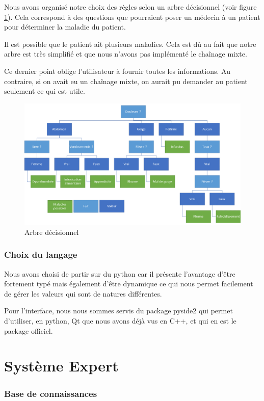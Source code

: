 \documentclass[a4paper, 11pt]{article}
\begin{document}
Nous avons organisé notre choix des règles selon un arbre décisionnel (voir figure \ref{arbre}). Cela correspond à des questions que pourraient poser un médecin à un patient pour déterminer la maladie du patient.

Il est possible que le patient ait plusieurs maladies. Cela est dû au fait que notre arbre est très simplifié et que nous n'avons pas implémenté le chaînage mixte.

Ce dernier point oblige l'utilisateur à fournir toutes les informations. Au contraire, si on avait eu un chaînage mixte, on aurait pu demander au patient seulement ce qui est utile. 

\begin{figure}[H]
    \centering
    \includegraphics[width=15cm]{arbre.png}
    \caption{\label{arbre} Arbre décisionnel}
\end{figure}

\section{Choix du langage}

Nous avons choisi de partir sur du python car il présente l'avantage d'être fortement typé mais également d'être dynamique ce qui nous permet facilement de gérer les valeurs qui sont de natures différentes.

Pour l'interface, nous nous sommes servis du package pyside2 qui permet d'utiliser, en python, Qt que nous avons déjà vus en C++, et qui en est le package officiel.

\part{Système Expert}

\section{Base de connaissances}
\end{document}
